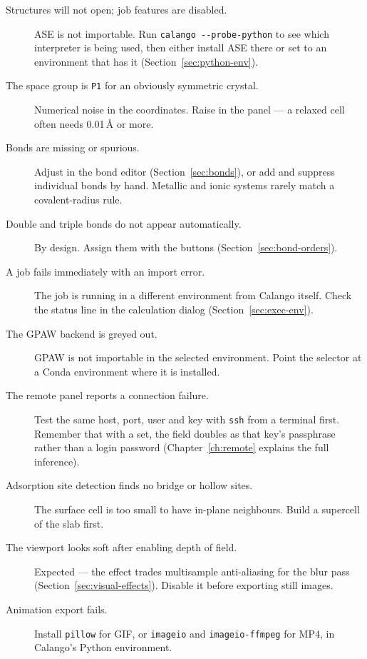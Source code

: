 \begin{description}
  \item[Structures will not open; job features are disabled.]
    ASE is not importable. Run \lstinline|calango --probe-python| to see
    which interpreter is being used, then either install ASE there or set
     to an environment that has it
    (Section~\ref{sec:python-env}).

  \item[The space group is \texttt{P1} for an obviously symmetric crystal.]
    Numerical noise in the coordinates. Raise  in the
     panel --- a relaxed cell often needs 0.01\,\AA{} or
    more.

  \item[Bonds are missing or spurious.]
    Adjust  in the bond editor
    (Section~\ref{sec:bonds}), or add and suppress individual bonds by
    hand. Metallic and ionic systems rarely match a covalent-radius rule.

  \item[Double and triple bonds do not appear automatically.]
    By design. Assign them with the  buttons
    (Section~\ref{sec:bond-orders}).

  \item[A job fails immediately with an import error.]
    The job is running in a different environment from Calango itself.
    Check the  status line in the calculation
    dialog (Section~\ref{sec:exec-env}).

  \item[The GPAW backend is greyed out.]
    GPAW is not importable in the selected environment. Point the
     selector at a Conda environment where it is installed.

  \item[The remote panel reports a connection failure.]
    Test the same host, port, user and key with \texttt{ssh} from a
    terminal first. Remember that with a  set, the
     field doubles as that key's passphrase rather than a
    login password (Chapter~\ref{ch:remote} explains the full inference).

  \item[Adsorption site detection finds no bridge or hollow sites.]
    The surface cell is too small to have in-plane neighbours. Build a
    supercell of the slab first.

  \item[The viewport looks soft after enabling depth of field.]
    Expected --- the effect trades multisample anti-aliasing for the blur
    pass (Section~\ref{sec:visual-effects}). Disable it before exporting
    still images.

  \item[Animation export fails.]
    Install \texttt{pillow} for GIF, or \texttt{imageio} and
    \texttt{imageio-ffmpeg} for MP4, in Calango's Python environment.
\end{description}

